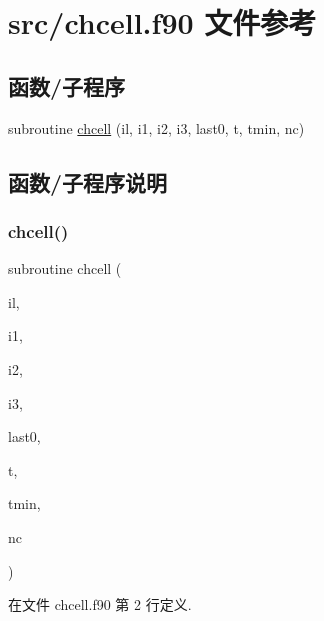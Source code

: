 \hypertarget{chcell_8f90}{}\section{src/chcell.f90 文件参考}
\label{chcell_8f90}
\subsection*{函数/子程序}
\begin{DoxyCompactItemize}
\item 
subroutine \mbox{\hyperlink{chcell_8f90_a099d11a05f0ddb17b840b315048e7732}{chcell}} (il, i1, i2, i3, last0, t, tmin, nc)
\end{DoxyCompactItemize}


\subsection{函数/子程序说明}
\mbox{\label{chcell_8f90_a099d11a05f0ddb17b840b315048e7732}} 
\subsubsection{\texorpdfstring{chcell()}{chcell()}}
{\footnotesize\ttfamily subroutine chcell (\begin{DoxyParamCaption}\item[{}]{il,  }\item[{}]{i1,  }\item[{}]{i2,  }\item[{}]{i3,  }\item[{}]{last0,  }\item[{}]{t,  }\item[{}]{tmin,  }\item[{}]{nc }\end{DoxyParamCaption})}



在文件 chcell.\+f90 第 2 行定义.

